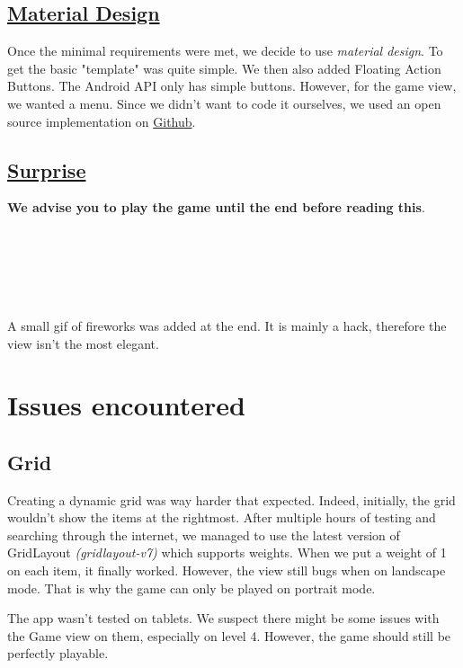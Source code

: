 \documentclass{article}
\begin{document}
\subsection{\href{https://media.tenor.co/images/131a172b8a349afd711cd7de7ab1177a/raw}{Material Design}}

Once the minimal requirements were met, we decide to use \textit{material design}. To get the basic "template" was quite simple. We then also added Floating Action Buttons. The Android API only has simple buttons. However, for the game view, we wanted a menu. Since we didn't want to code it ourselves, we used an open source implementation on \href{https://github.com/Clans/FloatingActionButton}{Github}.

\subsection{\href{https://media.giphy.com/media/RmmUkEitovbyM/giphy.gif}{Surprise}}

\textbf{We advise you to play the game until the end before reading this}. 

\ \\ 
\ \\
\ \\
\ \\
\ \\

A small gif of fireworks was added at the end. It is mainly a hack, therefore the view isn't the most elegant. 


\section{Issues encountered}

\subsection{Grid}

Creating a dynamic grid was way harder that expected. Indeed, initially, the grid wouldn't show the items at the rightmost. After multiple hours of testing and searching through the internet, we managed to use the latest version of GridLayout \textit{(gridlayout-v7)} which supports weights. When we put a weight of 1 on each item, it finally worked. However, the view still bugs when on landscape mode. That is why the game can only be played on portrait mode.

The app wasn't tested on tablets. We suspect there might be some issues with the Game view on them, especially on level 4. However, the game should still be perfectly playable.
\end{document}
